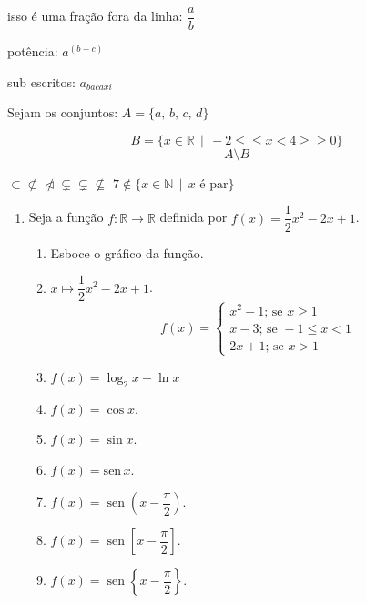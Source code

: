 \documentclass[a4paper,12pt]{article}
\DeclareMathOperator{\sen}{sen}
\begin{document}
   isso é uma fração fora da linha: $\dfrac{a}{b}$
   
   potência: $a^{(b+c)}$
   
   sub escritos: $a_{bacaxi}$
   
   Sejam os conjuntos: $ A = \{ a,\,b,\,c,\,d\}$
   
   $$ B= \{ x\in \mathbb{R} \,\mid \,-2 \leq \leqslant x < 4\geqslant \geq 0 \}  $$ 
   $$A \setminus B$$
   
   $\subset \not\subset \ntriangleleft \subsetneq \varsubsetneq\nsubseteq$ \newline $7 \not\in \{ x \in \mathbb{N} \, \mid \,x \textrm{ é par}\}$  
   \begin{enumerate}
      \item Seja a função $f:\mathbb{R} \to \mathbb{R}$ definida por $f(x)= \dfrac{1}{2}x^2-2x + 1$.
      \begin{enumerate}
         \item Esboce o gráfico da função.
         \item $x \mapsto \dfrac{1}{2}x^2-2x + 1$.
         $$f(x)=   
   \begin{cases}
      x^2 - 1; \,\textrm{se } x \geq 1\\
      x-3;\,\textrm{se }-1 \leq x < 1\\
      2x + 1; \,\textrm{se } x>1
   \end{cases}$$
         \item $f(x)= \log_2x + \ln x $
         \item $f(x) = \cos x$.
         \item $f(x) = \sin x$.
         \item $f(x) = \textrm{sen}\, x$.
         \item $f(x) = \sen \left( x- \dfrac{\pi}{2}\right)$.
         \item $f(x) = \sen \left[ x- \dfrac{\pi}{2}\right]$.
         
          \item $f(x) = \sen \left\{ x- \dfrac{\pi}{2}\right\}$.
      \end{enumerate}
   \end{enumerate}     
   
   
   
\end{document}
